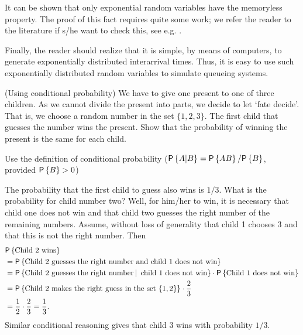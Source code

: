 It can be shown that only exponential random variables have the
memoryless property. The proof of this fact requires quite some work;
we refer the reader to the literature if s/he want to check this, see
e.g. \citet[Appendix 3]{yushkevich69:_markov_proces}.

Finally, the reader should realize that it is simple, by means of
computers, to generate exponentially distributed interarrival
times. Thus, it is easy to use such exponentially distributed random
variables to simulate queueing systems. 



\begin{question}(Using conditional probability)
  We have to give one present to one of three children. As we cannot
  divide the present into parts, we decide to let `fate decide'. That
  is, we choose a random number in the set $\{1, 2, 3\}$. The first
  child that guesses the number wins the present. Show that the
  probability of winning the present is the same for each child.
\begin{solution}
    Use the definition of conditional probability
    ($\P{A|B} = \P{AB}/\P{B}$, provided $\P{B}>0$)

    The probability that the first child to guess also wins is
    $1/3$. What is the probability for child number two? Well, for
    him/her to win, it is necessary that child one does not win and
    that child two guesses the right number of the remaining
    numbers. Assume, without loss of generality that child 1 chooses
    $3$ and that this is not the right number. Then 
    \begin{equation*}
      \begin{split}
&\P{\text{Child  2 wins}} \\
&= \P{\text{Child 2 guesses the right number and child 1 does not win}} \\
&= \P{\text{Child 2 guesses the right number} \given \text{ child 1 does not win}}
\cdot \P{\text{Child 1 does not win}} \\
&= \P{\text{Child 2 makes the right guess in the set $\{1,2\}$}}\cdot \frac 23 \\
&= \frac 1 2\cdot \frac 23  = \frac 1 3.
      \end{split}
    \end{equation*}
    Similar conditional reasoning gives that child 3 wins with probability $1/3$. 
  \end{solution}
\end{question}

